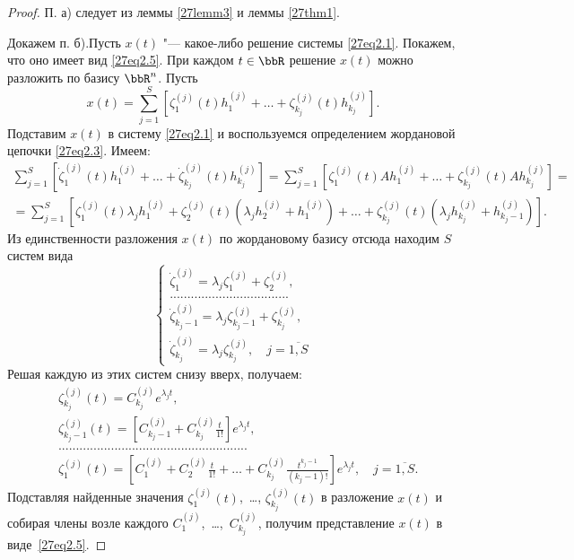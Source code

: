 \begin{proof}
П. а) следует из леммы \ref{27lemm3} и леммы \ref{27thm1}. 

Докажем п. б).Пусть $x(t)$ "--- какое-либо решение системы \eqref{27eq2.1}. Покажем, что оно имеет вид \eqref{27eq2.5}. При каждом $t\in\bbR$ решение $x(t)$ можно разложить по базису $\bbR^n$. Пусть
$$
x(t)=\sum\limits_{j=1}^S\left[\zeta_1^{(j)}(t)h_1^{(j)}+\ldots+\zeta_{k_j}^{(j)}(t)h_{k_j}^{(j)}\right].
$$
Подставим $x(t)$ в систему \eqref{27eq2.1} и воспользуемся определением жордановой цепочки \eqref{27eq2.3}. Имеем:
\begin{multline*}
\sum\limits_{j=1}^S\left[\dot\zeta_1^{(j)}(t)h_1^{(j)}+\ldots+\dot\zeta_{k_j}^{(j)}(t)h_{k_j}^{(j)}\right]=\sum\limits_{j=1}^S\left[\zeta_1^{(j)}(t)Ah_1^{(j)}+\ldots+\zeta_{k_j}^{(j)}(t)Ah_{k_j}^{(j)}\right]=\\=\sum\limits_{j=1}^S\left[\zeta_1^{(j)}(t)\lambda_jh_1^{(j)}+\zeta_2^{(j)}(t)\left(\lambda_jh_2^{(j)}+h_1^{(j)}\right)+\ldots+\zeta_{k_j}^{(j)}(t)\left(\lambda_jh_{k_j}^{(j)}+h_{k_j-1}^{(j)}\right)\right].
\end{multline*}
Из единственности разложения $x(t)$ по жордановому базису отсюда находим $S$ систем вида
$$
\begin{cases}
\dot{\zeta}_1^{(j)}=\lambda_j\zeta_1^{(j)}+\zeta_2^{(j)},\\
..................................\\
\dot{\zeta}_{k_j-1}^{(j)}=\lambda_j\zeta_{k_j-1}^{(j)}+\zeta_{k_j}^{(j)},\\
\dot{\zeta}_{k_j}^{(j)}=\lambda_j\zeta_{k_j}^{(j)},\quad j=\overline{1,S}
\end{cases}
$$
Решая каждую из этих систем снизу вверх, получаем:
$$
\begin{aligned}
&\zeta_{k_j}^{(j)}(t)=C_{k_j}^{(j)}e^{\lambda_jt},\\
&\zeta_{k_j-1}^{(j)}(t)=\left[C_{k_j-1}^{(j)}+C_{k_j}^{(j)}\frac{t}{1!}\right]e^{\lambda_j t},\\
&......................................................\\
&\zeta_1^{(j)}(t)=\left[C_1^{(j)}+C_2^{(j)}\frac{t}{1!}+\ldots+C_{k_j}^{(j)}\frac{t^{k_j-1}}{(k_j-1)!}\right]e^{\lambda_jt},\quad j=\overline{1,S}.
\end{aligned}
$$
Подставляя найденные значения $\zeta_1^{(j)}(t)$,~\dots, $\zeta_{k_j}^{(j)}(t)$ в разложение $x(t)$ и собирая члены возле каждого $C_1^{(j)}$,~\dots ,~$C_{k_j}^{(j)}$, получим представление $x(t)$ в виде~\eqref{27eq2.5}.
\end{proof}







